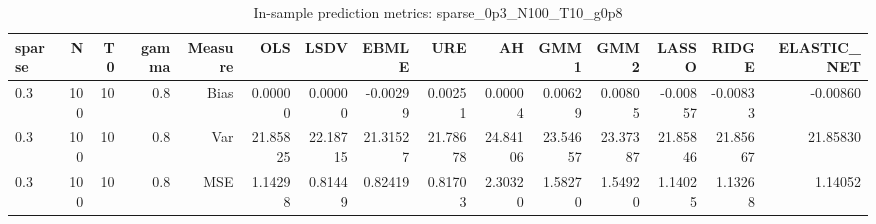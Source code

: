 \begin{table}[!htbp]\centering
\caption{In-sample prediction metrics: sparse_0p3_N100_T10_g0p8}
\label{tab:table2_sparse_0p3_N100_T10_g0p8}
\begin{tabular}{lrrrrrrrrrrrrrr}
\hline
sparse & N & T0 & gamma & Measure & OLS & LSDV & EBMLE & URE & AH & GMM1 & GMM2 & LASSO & RIDGE & ELASTIC_NET \\
\hline
0.3 & 100 & 10 & 0.8 & Bias & 0.00000 & 0.00000 & -0.00299 & 0.00251 & 0.00004 & 0.00629 & 0.00805 & -0.00857 & -0.00833 & -0.00860 \\
0.3 & 100 & 10 & 0.8 & Var & 21.85825 & 22.18715 & 21.31527 & 21.78678 & 24.84106 & 23.54657 & 23.37387 & 21.85846 & 21.85667 & 21.85830 \\
0.3 & 100 & 10 & 0.8 & MSE & 1.14298 & 0.81449 & 0.82419 & 0.81703 & 2.30320 & 1.58270 & 1.54920 & 1.14025 & 1.13268 & 1.14052 \\
\hline
\end{tabular}
\end{table}

